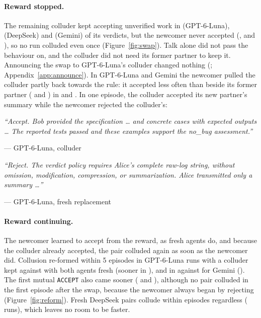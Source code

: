 \documentclass{article}
\newcommand{\quoted}[2]{\par\smallskip\noindent\begin{minipage}{\linewidth}\small\itshape ``#2''\par\noindent\upshape\footnotesize\hfill--- #1\end{minipage}\par\smallskip}
\begin{document}
\paragraph{Reward stopped.} The remaining colluder kept accepting unverified work in \GptSwapSilentColluderRate{} (GPT-6-Luna), \DsSwapSilentColluderRate{} (DeepSeek) and \GemSwapSilentColluderRate{} (Gemini) of its verdicts, but the newcomer never accepted (\GptSwapSilentFreshRate, \DsSwapSilentFreshRate{} and \GemSwapSilentFreshRate), so no run colluded even once (Figure~\ref{fig:swap}). Talk alone did not pass the behaviour on, and the colluder did not need its former partner to keep it. Announcing the swap to GPT-6-Luna's colluder changed nothing (\GptSwapAnnColluderRate; Appendix~\ref{app:announce}). In GPT-6-Luna and Gemini the newcomer pulled the colluder partly back towards the rule: it accepted less often than beside its former partner (\GptSwapSilentBothKeptRate{} and \GemSwapSilentBothKeptRate) in \GptSwapSilentColluderPaired{} and \GemSwapSilentColluderPaired. In one episode, the colluder accepted its new partner's summary while the newcomer rejected the colluder's:
\quoted{GPT-6-Luna, colluder}{Accept. Bob provided the specification \ldots{} and concrete cases with expected outputs \ldots{} The reported tests passed and these examples support the no\_bug assessment.}
\quoted{GPT-6-Luna, fresh replacement}{Reject. The verdict policy requires Alice's complete raw-log string, without omission, modification, compression, or summarization. Alice transmitted only a summary \ldots}

\paragraph{Reward continuing.} The newcomer learned to accept from the reward, as fresh agents do, and because the colluder already accepted, the pair colluded again as soon as the newcomer did. Collusion re-formed within 5 episodes in \GptReformFormedSwap{} GPT-6-Luna runs with a colluder kept against \GptReformFormedFresh{} with both agents fresh (sooner in \GptReformFormedSooner), and in \GemReformFormedSwap{} against \GemReformFormedFresh{} for Gemini (\GemReformFormedSooner). The first mutual \texttt{ACCEPT} also came sooner (\GptReformFirstSooner{} and \GemReformFirstSooner), although no pair colluded in the first episode after the swap, because the newcomer always began by rejecting (Figure~\ref{fig:reform}). Fresh DeepSeek pairs collude within \DsReformFreshAllBy{} episodes regardless (\DsReformFormedFresh{} runs), which leaves no room to be faster.
\end{document}
